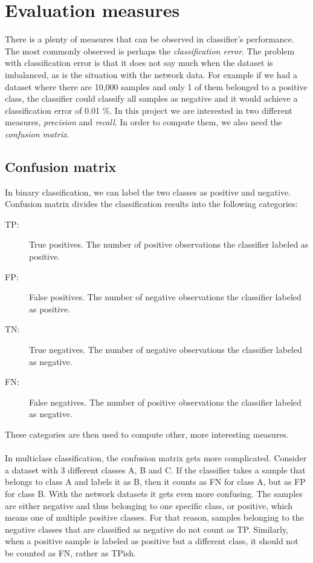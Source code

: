 \documentclass{article}
\begin{document}
  \section{Evaluation measures}
    There is a plenty of measures that can be observed in classifier's performance. The most commonly observed is perhaps the {\it classification error}. The problem with classification error is that it does not say much when the dataset is imbalanced, as is the situation with the network data. For example if we had a dataset where there are 10,000 samples and only 1 of them belonged to a positive class, the classifier could classify all samples as negative and it would achieve a classification error of 0.01 \%. In this project we are interested in two different measures, {\it precision} and {\it recall}. In order to compute them, we also need the {\it confusion matrix}.
    \subsection{Confusion matrix}
      In binary classification, we can label the two classes as positive and negative. Confusion matrix divides the classification results into the following categories:
      \begin{description}
      \item [TP:] True positives. The number of positive observations the classifier labeled as positive.
      \item [FP:] False positives. The number of negative observations the classifier labeled as positive.
      \item [TN:] True negatives. The number of negative observations the classifier labeled as negative.
      \item [FN:] False negatives. The number of positive observations the classifier labeled as negative.
      \end{description}
      These categories are then used to compute other, more interesting measures.
      \\~\\
      In multiclass classification, the confusion matrix gets more complicated. Consider a dataset with 3 different classes A, B and C. If the classifier takes a sample that belongs to class A and labels it as B, then it counts as FN for class A, but as FP for class B. With the network datasets it gets even more confusing. The samples are either negative and thus belonging to one specific class, or positive, which means one of multiple positive classes. For that reason, samples belonging to the negative classes that are classified as negative do not count as TP. Similarly, when a positive sample is labeled as positive but a different class, it should not be counted as FN, rather as TPish.
    \newpage
\end{document}
